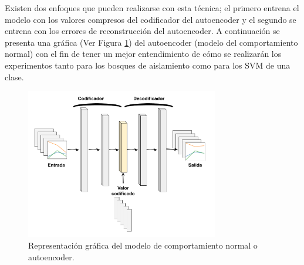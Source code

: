 \vspace{5mm} %

Existen dos enfoques que pueden realizarse con esta t\'{e}cnica; el primero entrena el modelo con los valores compresos del codificador del autoencoder y el segundo se entrena con los errores de reconstrucci\'{o}n del autoencoder. A continuaci\'{o}n se presenta una gr\'{a}fica (Ver Figura \ref{fig:autoencoder}) del autoencoder (modelo del comportamiento normal) con el fin de tener un mejor entendimiento de c\'{o}mo se realizar\'{a}n los experimentos tanto para los bosques de aislamiento como para los SVM de una clase.

\begin{figure}[H]
        \centering
            \includegraphics[width=0.75\textwidth, frame]{imagenes/Cap5/autoencoder}
        \caption{Representaci\'{o}n gr\'{a}fica del modelo de comportamiento normal o autoencoder.}
		\label{fig:autoencoder}
\end{figure}

